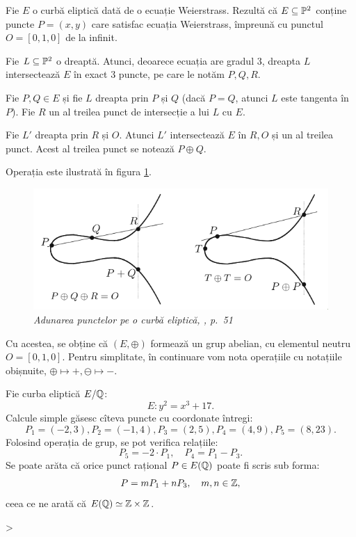 Fie $ E $ o curbă eliptică dată de o ecuație Weierstrass. Rezultă că
$ E \subseteq \mathbb{P}^2 $ conține puncte $ P = (x, y) $ care satisfac ecuația
Weierstrass, împreună cu punctul $ O = [0, 1, 0] $ de la infinit.

Fie $ L \subseteq \mathbb{P}^2 $ o dreaptă. Atunci, deoarece ecuația are gradul 3,
dreapta $ L $ intersectează $ E $ în exact 3 puncte, pe care le notăm
$ P, Q, R $.

\begin{definition}\label{def:adunare-eliptic}
    Fie $P, Q \in E $ și fie $ L $ dreapta prin $ P $ și $ Q $ (dacă $ P = Q $,
    atunci $ L $ este tangenta în $ P $). Fie $ R $ un al treilea punct
    de intersecție a lui $ L $ cu $ E $.

    Fie $ L' $ dreapta prin $ R $ și $ O $. Atunci $ L' $ intersectează
    $ E $ în $ R, O $ și un al treilea punct. Acest al treilea punct se notează
    $ P \oplus Q $.
\end{definition}

Operația este ilustrată în figura \ref{fig:adunare-el}.
\begin{figure}[!htbp]
    \centering
    \includegraphics[scale=0.5]{figs/adunare-el.png}
    \caption{\textit{Adunarea punctelor pe o curbă eliptică, \cite{sil09}, p.\ 51}}
    \label{fig:adunare-el}
\end{figure}

Cu acestea, se obține că $ (E, \oplus) $ formează un grup abelian, cu elementul
neutru $ O = [0, 1, 0] $. Pentru simplitate, în continuare vom nota operațiile
cu notațiile obișnuite, $ \oplus \mapsto +, \ominus \mapsto - $.

\begin{example}\label{exm:eliptic-grup}
    Fie curba eliptică $ E/\mathbb{Q} $:
    \[
          E : y^2 = x^3 + 17.
    \]
    Calcule simple găsesc cîteva puncte cu coordonate întregi:
    \[
        P_1 = (-2, 3), P_2 = (-1, 4), P_3 = (2, 5), P_4 = (4, 9), P_5 = (8, 23).
    \]
    Folosind operația de grup, se pot verifica relațiile:
    \[
          P_5 = -2 \cdot P_1, \quad P_4 = P_1 - P_3.
    \]
    Se poate arăta că orice punct rațional $ P \in E(\mathbb{Q}) $ poate fi scris sub forma:
    \[
          P = mP_1 + nP_3, \quad m, n \in \mathbb{Z},
    \]
    ceea ce ne arată că $ E(\mathbb{Q}) \simeq \mathbb{Z} \times \mathbb{Z} $.
\end{example}>

